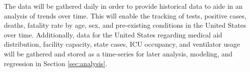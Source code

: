 \documentclass[11pt]{article}
\newcommand{\comment}[1]{{\color{red}{#1}}}
\begin{document}
\noindent
The data will be gathered daily in order to provide historical data to aide in an analysis of trends over time. This will enable the tracking of tests, positive cases, deaths, fatality rate by age, sex, and pre-existing conditions in the United States over time. Additionally, data for the United States regarding medical aid distribution, facility capacity, state cases, ICU occupancy, and ventilator usage will be gathered and stored as a time-series for later analysis, modeling, and regression in Section \ref{sec:analysis}.








\end{document}
